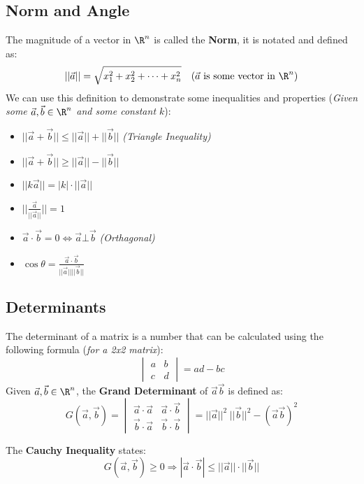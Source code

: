 \documentclass[a4paper]{article}
\begin{document}
  \subsection{Norm and Angle}
  The magnitude of a vector in $\R^n$ is called the \textbf{Norm}, it is notated and defined as:
  \[
    ||\vec{a}|| = \sqrt{x_1^2 + x_2^2 + \dots + x_n^2} \quad (\vec{a}\textrm{ is some vector in }\R^n)
  \]
  We can use this definition to demonstrate some inequalities and properties (\textit{Given some $\vec{a},\vec{b} \in \R^n$ and some constant $k$}):
  \begin{itemize}
    \item $|| \vec{a} + \vec{b} ||  \le ||\vec{a}|| + ||\vec{b}||$ \textit{(Triangle Inequality)}
    \item $|| \vec{a} + \vec{b} || \geq ||\vec{a}|| - ||\vec{b}||$
    \item $|| k \vec{a} || = |k| \cdot || \vec{a}||$
    \item $|| \displaystyle\frac{\vec{a}}{||\vec{a}||}|| = 1$
    \item $\vec{a} \cdot \vec{b} = 0 \Leftrightarrow \vec{a} \bot \vec{b}$ \textit{(Orthagonal)}
    \item $\cos \theta = \displaystyle\frac{\vec{a}\cdot\vec{b}}{||\vec{a}||  ||\vec{b}||}$
  \end{itemize}
  \subsection{Determinants}
  The determinant of a matrix is a number that can be calculated using the following formula (\textit{for a 2x2 matrix}):
  \[
    \begin{vmatrix}
      a & b \\ c & d
    \end{vmatrix}
    = ad - bc
  \]
  Given $\vec{a},\vec{b} \in \R^n$, the \textbf{Grand Determinant} of $\vec{a}\vec{b}$ is defined as:
  \[
    G(\vec{a},\vec{b})
    = \begin{vmatrix}
      \vec{a} \cdot \vec{a} & \vec{a} \cdot \vec{b} \\
      \vec{b} \cdot \vec{a} & \vec{b} \cdot \vec{b}
    \end{vmatrix}
    = ||\vec{a}||^2 \ ||\vec{b}||^2 - (\vec{a}\vec{b})^2
  \]
  \begin{lemma}
    The \textbf{Cauchy Inequality} states:
    \[
      G (\vec{a},\vec{b}) \geq 0 \Rightarrow |\vec{a} \cdot \vec{b}| \le || \vec{a}|| \cdot || \vec{b} ||
    \]
  \end{lemma}
\end{document}
